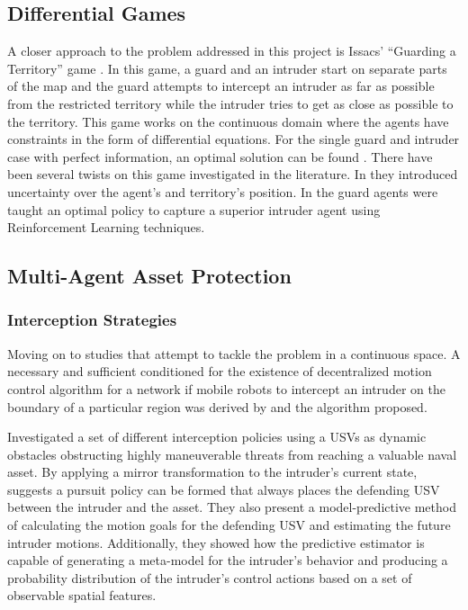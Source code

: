 \documentclass[bsc,frontabs,twoside,singlespacing,parskip,deptreport]{infthesis}     %
\begin{document}
\subsection{Differential Games}
A closer approach to the problem addressed in this project is Issacs’ “Guarding a Territory” game \cite{isaacs1999differential}. In this game, a guard and an intruder start on separate parts of the map and the guard attempts to intercept an intruder as far as possible from the restricted territory while the intruder tries to get as close as possible to the territory. This game works on the continuous domain where the agents have constraints in the form of differential equations. For the single guard and intruder case with perfect information, an optimal solution can be found \cite{isaacs1999differential}. There have been several twists on this game investigated in the literature. In \cite{meng1999fuzzy} they introduced uncertainty over the agent’s and territory’s position. In \cite{raslan2016learning} the guard agents were taught an optimal policy to capture a superior intruder agent using Reinforcement Learning techniques.

\subsection{Multi-Agent Asset Protection}
\subsubsection{Interception Strategies}
Moving on to studies that attempt to tackle the problem in a continuous space. A necessary and sufficient conditioned for the existence of decentralized motion control algorithm for a network if mobile robots to intercept an intruder on the boundary of a particular region was derived by \cite{marzoughi2018collision} and the algorithm proposed. 

\cite{gupta2015block} Investigated a set of different interception policies using a USVs as dynamic obstacles obstructing highly maneuverable threats from reaching a valuable naval asset. By applying a mirror transformation to the intruder's current state, \cite{gupta2015block} suggests a pursuit policy can be formed that always places the defending USV between the intruder and the asset. They also present a model-predictive method of calculating the motion goals for the defending USV and estimating the future intruder motions. Additionally, they showed how the predictive estimator is capable of generating a meta-model for the intruder's behavior and producing a probability distribution of the intruder's control actions based on a set of observable spatial features. 
\end{document}
